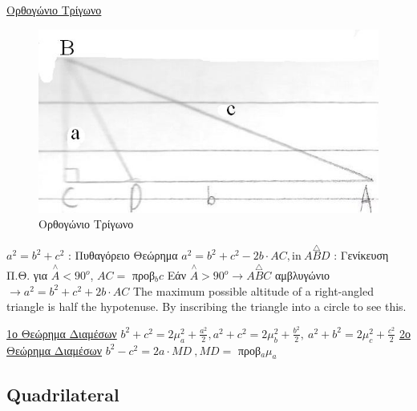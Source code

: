 \documentclass[12pt]{article}
\begin{document}
\begin{flushleft}
	\uline{\textgreek{Ορθογώνιο Τρίγωνο}} \linebreak
	
	\begin{figure}[ht]
	\centering
	\includegraphics[scale=2]{orthTrigono}
	\caption{\textgreek{Ορθογώνιο Τρίγωνο}}
	\label{fig:orthTrigono}
	\end{figure}
	
	\textbullet \quad $\displaystyle  a^2 = b^2 + c^2 $  :  \textgreek{Πυθαγόρειο Θεώρημα} \linebreak 
 	\textbullet \quad $\displaystyle  a^2 = b^2 + c^2 - 2b\cdot AC, \text{in}\  A\overset{\triangle}{B}D $  \textgreek{: Γενίκευση Π.Θ. για} $\displaystyle \overset{\wedge}{A} < 90^o$, $AC = $ \textgreek{προβ}$_b c $ \linebreak
	\textbullet \quad \textgreek{Εάν} $\displaystyle \overset{\wedge}{A} > 90^o \rightarrow A\overset{\triangle}{B}C $ \textgreek{αμβλυγώνιο} $\displaystyle  \rightarrow a^2 = b^2 + c^2 +2b \cdot AC $ \linebreak 
	\textbullet \quad The maximum possible altitude of a right-angled triangle is half the hypotenuse. By inscribing the triangle into a circle to see this. \linebreak 
	
	\uline{\textgreek{1ο Θεώρημα Διαμέσων}} \linebreak
	\textbullet \quad $\displaystyle b^2 + c^2 = 2\mu_a^2 + \frac{a^2}{2} , a^2 + c^2 = 2\mu_b^2 + \frac{b^2}{2} ,\ a^2 + b^2 = 2\mu_c^2 + \frac{c^2}{2} $ \linebreak
	\uline{\textgreek{2ο Θεώρημα Διαμέσων}} \linebreak
	\textbullet \quad $\displaystyle b^2 -c^2 = 2a \cdot MD \ , MD = $ \textgreek{προβ}$_a \mu_a$ \linebreak 
	
	
	\subsection{Quadrilateral}
	

\end{flushleft}
\end{document}
